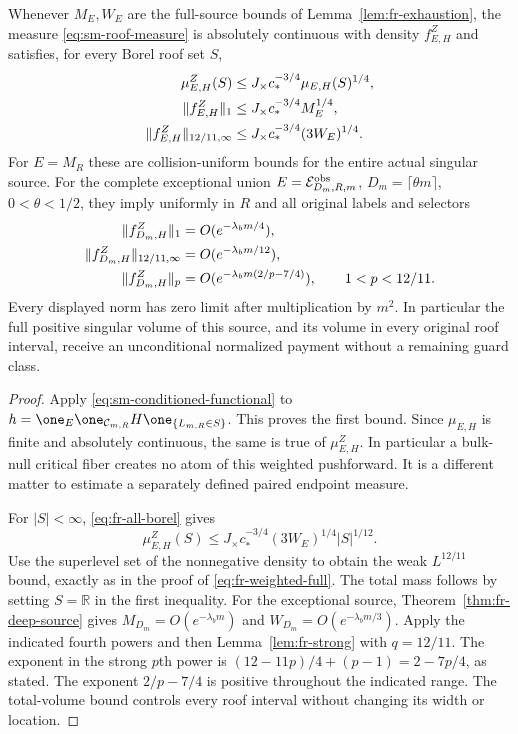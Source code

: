 \begin{theorem}
\label{thm:sm-roof}
Whenever $M_E,W_E$ are the full-source bounds of
Lemma~\ref{lem:fr-exhaustion}, the measure
\eqref{eq:sm-roof-measure} is absolutely continuous with density
$f^Z_{E,H}$ and satisfies, for every Borel roof set $S$,
\begin{align}\label{eq:sm-roof}
 \mu^Z_{E,H}(S)
       &\le J_\times c_*^{-3/4}\mu_{E,H}(S)^{1/4},\notag\\
 \|f^Z_{E,H}\|_1
       &\le J_\times c_*^{-3/4}M_E^{1/4},\notag\\
 \|f^Z_{E,H}\|_{12/11,\infty}
       &\le J_\times c_*^{-3/4}(3W_E)^{1/4}.
\end{align}
For $E=M_R$ these are collision-uniform bounds for the entire
actual singular source.  For the complete exceptional union
$E=\mathcal E^{\rm obs}_{D_m,R,m}$, $D_m=\lceil\theta m\rceil$,
$0<\theta<1/2$, they imply uniformly in $R$ and all original
labels and selectors
\begin{align}\label{eq:sm-roof-rates}
 \|f^Z_{D_m,H}\|_1&=O(e^{-\lambda_bm/4}),\notag\\
 \|f^Z_{D_m,H}\|_{12/11,\infty}
                       &=O(e^{-\lambda_bm/12}),\notag\\
 \|f^Z_{D_m,H}\|_p
                       &=O(e^{-\lambda_bm(2/p-7/4)}),
                                 \qquad1<p<12/11.
\end{align}
Every displayed norm has zero limit after multiplication by $m^2$.
In particular the full positive singular volume of this source,
and its volume in every original roof interval, receive an
unconditional normalized payment without a remaining guard class.
\end{theorem}
\begin{proof}
Apply \eqref{eq:sm-conditioned-functional} to
$h=\one_E\one_{\mathcal C_{m,R}}H\one_{\{L_{m,R}\in S\}}$.
This proves the first bound.  Since $\mu_{E,H}$ is finite and
absolutely continuous, the same is true of $\mu^Z_{E,H}$.
In particular a bulk-null critical fiber creates no atom of this
weighted pushforward.  It is a different matter to estimate a
separately defined paired endpoint measure.

For $|S|<\infty$, \eqref{eq:fr-all-borel} gives
\[
 \mu^Z_{E,H}(S)
       \le J_\times c_*^{-3/4}(3W_E)^{1/4}|S|^{1/12}.
\]
Use the superlevel set of the nonnegative density to obtain the
weak $L^{12/11}$ bound, exactly as in the proof of
\eqref{eq:fr-weighted-full}.  The total mass follows by setting
$S=\mathbb R$ in the first inequality.
For the exceptional source, Theorem~\ref{thm:fr-deep-source}
gives $M_{D_m}=O(e^{-\lambda_bm})$ and
$W_{D_m}=O(e^{-\lambda_bm/3})$.  Apply the indicated fourth
powers and then Lemma~\ref{lem:fr-strong} with $q=12/11$.
The exponent in the strong $p$th power is
$(12-11p)/4+(p-1)=2-7p/4$, as stated.
The exponent $2/p-7/4$ is positive throughout the indicated
range.  The total-volume bound controls every roof interval
without changing its width or location.
\end{proof}

